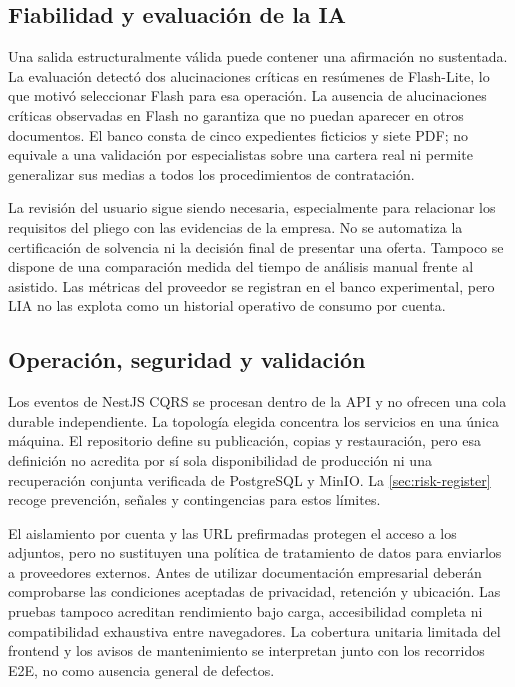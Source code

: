 \subsection{Fiabilidad y evaluación de la IA}

Una salida estructuralmente válida puede contener una afirmación no sustentada.
La evaluación detectó dos alucinaciones críticas en resúmenes de Flash-Lite,
lo que motivó seleccionar Flash para esa operación. La ausencia de
alucinaciones críticas observadas en Flash no garantiza que no puedan aparecer
en otros documentos. El banco consta de cinco expedientes ficticios y siete
PDF; no equivale a una validación por especialistas sobre una cartera real ni
permite generalizar sus medias a todos los procedimientos de contratación.

La revisión del usuario sigue siendo necesaria, especialmente para relacionar
los requisitos del pliego con las evidencias de la empresa. No se automatiza la
certificación de solvencia ni la decisión final de presentar una oferta. Tampoco
se dispone de una comparación medida del tiempo de análisis manual frente al
asistido. Las métricas del proveedor se registran en el banco experimental,
pero LIA no las explota como un historial operativo de consumo por cuenta.

\subsection{Operación, seguridad y validación}

Los eventos de NestJS CQRS se procesan dentro de la API y no ofrecen una cola
durable independiente. La topología elegida concentra los servicios en una
única máquina. El repositorio define su publicación, copias y restauración,
pero esa definición no acredita por sí sola disponibilidad de producción ni
una recuperación conjunta verificada de PostgreSQL y MinIO. La
\cref{sec:risk-register} recoge prevención, señales y contingencias para estos
límites.

El aislamiento por cuenta y las URL prefirmadas protegen el acceso a los
adjuntos, pero no sustituyen una política de tratamiento de datos para enviarlos
a proveedores externos. Antes de utilizar documentación empresarial deberán
comprobarse las condiciones aceptadas de privacidad, retención y ubicación.
Las pruebas tampoco acreditan rendimiento bajo carga, accesibilidad completa
ni compatibilidad exhaustiva entre navegadores. La cobertura unitaria limitada
del frontend y los avisos de mantenimiento se interpretan junto con los
recorridos E2E, no como ausencia general de defectos.

